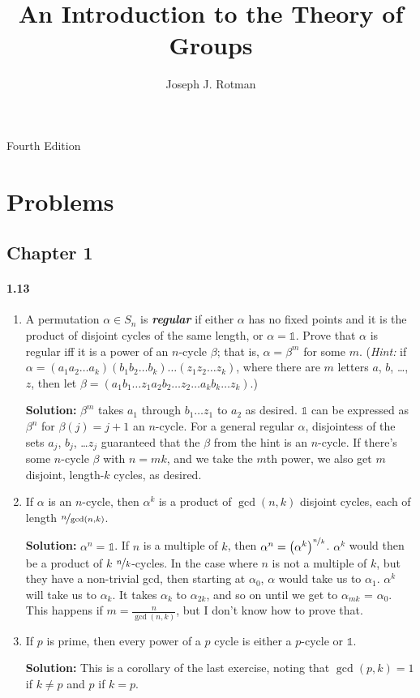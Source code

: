 \documentclass[12pt,a4paper]{article}
\title{An Introduction to the Theory of Groups}
\author{Joseph J. Rotman}
\providecommand{\id}{\mathbb{1}}
\providecommand{\bemph}[1]{\emph{\textbf{#1}}}
\providecommand{\hint}{\emph{Hint: }}
\providecommand{\soln}{\textbf{Solution: }}
\begin{document}
\maketitle
Fourth Edition
\section*{Problems}
\subsection*{Chapter 1}
\paragraph*{1.13}
\begin{enumerate}[label=(\roman*)]
\item A permutation $\alpha \in S_n$ is \bemph{regular} if either $\alpha$ has no fixed points and it is the product of disjoint cycles of the same length, or $\alpha = \id$. 
Prove that $\alpha$ is regular iff it is a power of an $n$-cycle $\beta$; that is, $\alpha = \beta^m$ for some $m$. (\hint if $\alpha = (a_1 a_2 \ldots a_k)(b_1 b_2 \ldots b_k)\ldots(z_1 z_2 \ldots z_k)$, where there are $m$ letters $a$, $b$, \ldots, $z$, then let $\beta = (a_1 b_1 \ldots z_1 a_2 b_2 \ldots z_2 \ldots a_k b_k \ldots z_k)$.)

\soln $\beta^m$ takes $a_1$ through $b_1 \ldots z_1$ to $a_2$ as desired. 
$\id$ can be expressed as $\beta^n$ for $\beta(j) = j+1$ an $n$-cycle. 
For a general regular $\alpha$, disjointess of the sets $a_j$, $b_j$, \ldots $z_j$ guaranteed that the $\beta$ from the hint is an $n$-cycle. 
If there's some $n$-cycle $\beta$ with $n=mk$, and we take the $m$th power, we also get $m$ disjoint, length-$k$ cycles, as desired.
\item If $\alpha$ is an $n$-cycle, then $\alpha^k$ is a product of $\gcd(n, k)$ disjoint cycles, each of length $\nicefrac{n}{\gcd(n, k)}$.

\soln $\alpha^n = \id$. If $n$ is a multiple of $k$, then $\alpha^n = \left( \alpha^{k} \right)^{\nicefrac{n}{k}}$.
$\alpha^k$ would then be a product of $k$ $\nicefrac{n}{k}$-cycles.
In the case where $n$ is not a multiple of $k$, but they have a non-trivial gcd, then starting at $\alpha_0$, $\alpha$ would take us to $\alpha_1$. 
$\alpha^k$ will take us to $\alpha_k$. 
It takes $\alpha_k$ to $\alpha_{2k}$, and so on until we get to $\alpha_{mk}$ = $\alpha_0$. 
This happens if $m = \frac{n}{\gcd(n,k)}$, but I don't know how to prove that. 
\item If $p$ is prime, then every power of a $p$ cycle is either a $p$-cycle or $\id$.

\soln This is a corollary of the last exercise, noting that $\gcd(p,k)=1$ if $k \neq p$ and $p$ if $k = p$.
\end{enumerate}
\end{document}
